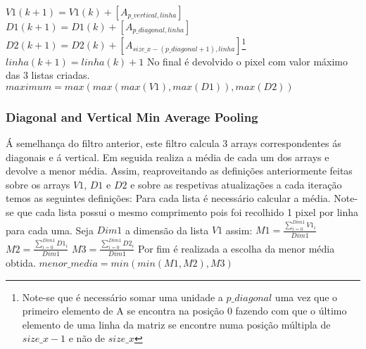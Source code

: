   $V1(k+1) = V1(k) + [ A_{p\_vertical,linha}]$\hfill\newline
  $D1(k+1) = D1(k) + [ A_{p\_diagonal,linha}]$\hfill\newline
  $D2(k+1) = D2(k) + [ A_{size\_x-(p\_diagonal+1),linha}]$\footnote{Note-se que é necessário somar uma unidade a $p\_diagonal$ uma vez que o primeiro elemento de A se encontra na posição 0 fazendo com que o último elemento de uma linha da matriz se encontre numa posição múltipla de $size\_x-1$ e não de $size\_x$}\hfill\newline
  $linha(k+1) = linha(k) + 1$\hfill\newline
  \hfill\newline
  No final é devolvido o pixel com valor máximo das 3 listas criadas.\hfill\newline
  \hfill\newline
  $maximum = max(max(max(V1),max(D1)),max(D2))$\hfill\newline
  \hfill\newline
\newpage

\subsubsection{Diagonal and Vertical Min Average Pooling}\hfill\newline
  \hfill\newline
  Á semelhança do filtro anterior, este filtro calcula 3 arrays correspondentes ás diagonais e á vertical. Em seguida realiza a média de cada um dos arrays e devolve a menor média. Assim, reaproveitando as definições anteriormente feitas sobre os arrays $V1$, $D1$ e $D2$ e sobre as respetivas atualizações a cada iteração temos as seguintes definições:\hfill\newline
  Para cada lista é necessário calcular a média. Note-se que cada lista possui o mesmo comprimento pois foi recolhido 1 pixel por linha para cada uma. Seja $Dim1$ a dimensão da lista $V1$ assim:\hfill\newline
  \hfill\newline
  $M1 = \frac{\sum_{i=0}^{Dim1} V1_i}{Dim1}$ \hfill\newline
  $M2 = \frac{\sum_{i=0}^{Dim1} D1_i}{Dim1}$ \hfill\newline
  $M3 = \frac{\sum_{i=0}^{Dim1} D2_i}{Dim1}$ \hfill\newline
  \hfill\newline
  Por fim é realizada a escolha da menor média obtida. \hfill\newline
  \hfill\newline
  $menor\_media = min(min(M1,M2),M3)$ \hfill\newline
  \hfill\newline
